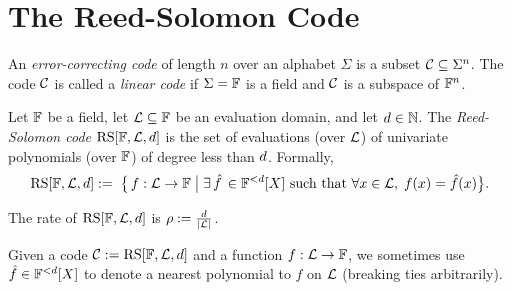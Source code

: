 \chapter{The Reed-Solomon Code}

\begin{definition}
    An \emph{error-correcting code} of length \(n\) over an alphabet \(\Sigma\) is a subset \(\mathcal{C} \subseteq \Sigma^n\). The code \(\mathcal{C}\) is called a \emph{linear code} if
    \(\Sigma = \mathbb{F}\) is a field and \(\mathcal{C}\) is a subspace of \({\mathbb{F}}^n\).
\end{definition}

\begin{definition}
    Let $\mathbb{F}$ be a field, let $\mathcal{L} \subseteq \mathbb{F}$ be an evaluation domain, and let $d \in \mathbb{N}$. The \emph{Reed-Solomon code} $\mathrm{RS}[\mathbb{F},\mathcal{L},d]$ is the set of evaluations (over $\mathcal{L}$) of univariate polynomials (over $\mathbb{F}$) of degree less than $d$. Formally,
    \[
        \mathrm{RS}[\mathbb{F},\mathcal{L},d]:=\; \bigl\{\, f : \mathcal{L} \to \mathbb{F} \;\big|\; \exists \,\hat{f} \,\in \mathbb{F}^{<d}[X]\text{ such that } \forall x \in \mathcal{L},\; f(x) = \hat{f}(x)\bigr\}.
    \]

    The rate of $\mathrm{RS}[\mathbb{F},\mathcal{L},d]$ is $\rho := \frac{d}{\lvert \mathcal{L} \rvert}$.

    Given a code $\mathcal{C} := \mathrm{RS}[\mathbb{F},\mathcal{L},d]$ and a function $f : \mathcal{L} \to \mathbb{F}$, we sometimes use $\hat{f} \in \mathbb{F}^{<d}[X]$ to denote a nearest polynomial to $f$ on $\mathcal{L}$ (breaking ties arbitrarily).
\end{definition}

